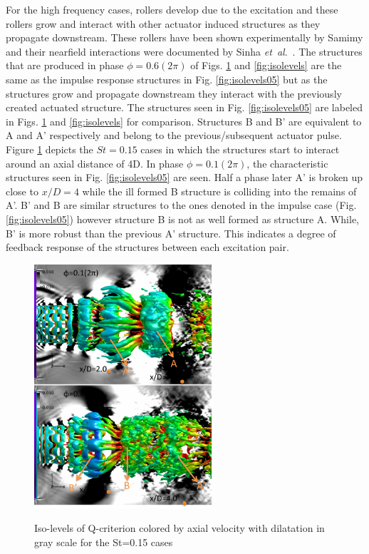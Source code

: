 \documentclass[english]{aiaa-tc}
\newcommand*{\etal}{\textit{et~al}.\ }
\begin{document}
For the high frequency cases, rollers develop due to the excitation and these rollers grow and interact with other actuator induced structures as they propagate downstream. These rollers have been shown experimentally by Samimy \cite{sm2007} and their nearfield interactions were documented by Sinha \etal \cite{sinha2013}. The structures that are produced in phase $\phi=0.6(2\pi)$ of Figs. \ref{fig:isolevels15} and \ref{fig:isolevels} are the same as the impulse response structures in Fig. \ref{fig:isolevels05} but as the structures grow and propagate downstream they interact with the previously created actuated structure. The structures seen in Fig. \ref{fig:isolevels05} are labeled in Figs. \ref{fig:isolevels15} and \ref{fig:isolevels} for comparison. Structures B and B' are equivalent to A and A' respectively and belong to the previous/subsequent actuator pulse. 
Figure \ref{fig:isolevels15} depicts the $St=0.15$ cases in which the structures start to interact around an axial distance of 4D. In phase $\phi=0.1(2\pi)$, the characteristic structures seen in Fig. \ref{fig:isolevels05} are seen. Half a phase later A' is broken up close to $x/D=4$ while the ill formed B structure is colliding into the remains of A'. B' and B are similar structures to the ones denoted in the impulse case (Fig. \ref{fig:isolevels05}) however structure B is not as well formed as structure A. While, B' is more robust than the previous A' structure. This indicates a degree of feedback response of the structures between each excitation pair. %
\begin{figure}
\begin{center}
\begin{centering}
{\includegraphics[width=2.6in]{M09St015qcritphase0106AB}}
\end{centering}
\caption{Iso-levels of Q-criterion colored by axial velocity with dilatation in gray scale for the St=0.15 cases}
\label{fig:isolevels15}
\end{center}
\end{figure}
\end{document}
